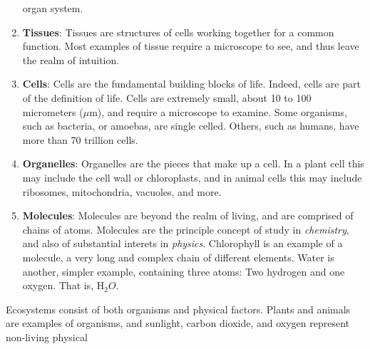 \documentclass[crop=false,class=book,oneside]{standalone}
\begin{document}
\begin{enumerate}
                  organ system.
            \item \textbf{Tissues}: Tissues are structures
                  of cells working together for a common
                  function. Most examples of tissue require
                  a microscope to see, and thus leave
                  the realm of intuition.
            \item \textbf{Cells}: Cells are the
                  fundamental building blocks of life.
                  Indeed, cells are part of the
                  definition of life. Cells are extremely
                  small, about 10 to 100 micrometers
                  ($\mu\textrm{m}$), and require a
                  microscope to examine. Some organisms,
                  such as bacteria, or amoebas, are
                  single celled. Others, such as humans,
                  have more than 70 trillion cells.
            \item \textbf{Organelles}: Organelles are the
                  pieces that make up a cell. In a plant
                  cell this may include the cell wall or
                  chloroplasts, and in animal cells this
                  may include ribosomes, mitochondria,
                  vacuoles, and more.
            \item \textbf{Molecules}: Molecules are
                  beyond the realm of \textrm{living},
                  and are comprised of chains of atoms.
                  Molecules are the principle concept of
                  study in \textit{chemistry}, and also
                  of substantial interets in
                  \textit{physics}. Chlorophyll is an
                  example of a molecule, a very long and
                  complex chain of different elements.
                  Water is another, simpler example,
                  containing three atoms: Two hydrogen and
                  one oxygen. That is,
                  $\textrm{H}_{2}O$.
        \end{enumerate}
        Ecosystems consist of both organisms and
        physical factors. Plants and animals
        are examples of organisms, and sunlight,
        carbon dioxide, and oxygen represent
        non-living physical
\end{document}
